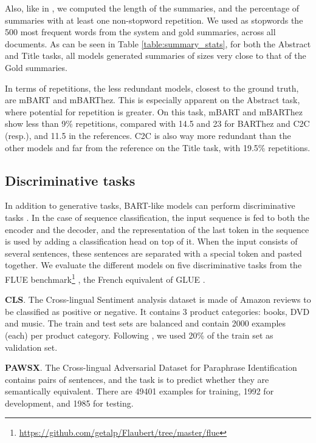 \documentclass[11pt,a4paper]{article}
\begin{document}
Also, like in \citet{rothe2020leveraging}, we computed the length of the summaries, and the percentage of summaries with at least one non-stopword repetition. We used as stopwords the 500 most frequent words from the system and gold summaries, across all documents.
As can be seen in Table \ref{table:summary_stats}, for both the Abstract and Title tasks, all models generated summaries of sizes very close to that of the Gold summaries.

In terms of repetitions, the less redundant models, closest to the ground truth, are mBART and mBARThez.
This is especially apparent on the Abstract task, where potential for repetition is greater.
On this task, mBART and mBARThez show less than 9\% repetitions, compared with 14.5 and 23 for BARThez and C2C (resp.), and 11.5 in the references.
C2C is also way more redundant than the other models and far from the reference on the Title task, with 19.5\% repetitions.

\subsection{Discriminative tasks}
In addition to generative tasks, BART-like models can perform discriminative tasks \cite{lewis2019bart}.
In the case of sequence classification, the input sequence is fed to both the encoder and the decoder, and the representation of the last token in the sequence is used by adding a classification head on top of it.
When the input consists of several sentences, these sentences are separated with a special token and pasted together.
We evaluate the different models on five discriminative tasks from the FLUE benchmark\footnote{\tiny\url{https://github.com/getalp/Flaubert/tree/master/flue}} \cite{le2019flaubert}, the French equivalent of GLUE \cite{wang2018glue}.

\noindent  \textbf{CLS}. The Cross-lingual Sentiment analysis dataset \cite{prettenhofer2010cross} is made of Amazon reviews to be classified as positive or negative.
It contains 3 product categories: books, DVD and music.
The train and test sets are balanced and contain 2000 examples (each) per product category.
Following  \citet{le2019flaubert}, we used 20\% of the train set as validation set.

\noindent  \textbf{PAWSX}. The Cross-lingual Adversarial Dataset for Paraphrase Identification \cite{yang2019paws} contains pairs of sentences, and the task is to predict whether they are semantically equivalent.
There are 49401 examples for training, 1992 for development, and 1985 for testing.
\end{document}

